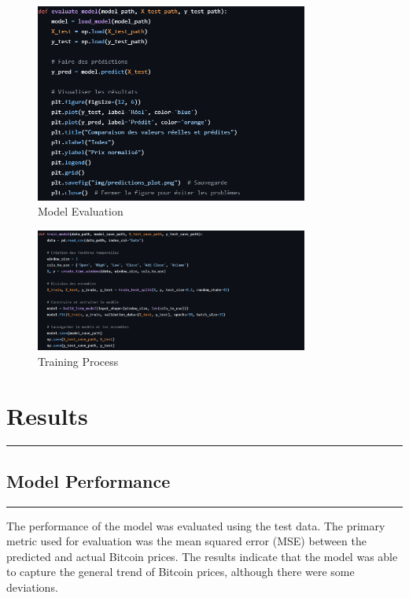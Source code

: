 \documentclass{article}
\begin{document}
\begin{figure}[h]
    \centering
    \includegraphics[width=0.8\textwidth]{img/evaluation.png}
    \caption{Model Evaluation} %
    \label{fig:evaluation}
\end{figure}

\begin{figure}[h]
    \centering
    \includegraphics[width=0.8\textwidth]{img/Capture d’écran 2025-01-05 201711.png}
    \caption{Training Process} %
    \label{fig:training}
\end{figure}

\section{Results}
\noindent\rule{\textwidth}{1pt} %
\subsection{Model Performance}
\noindent\rule{\textwidth}{1pt} %
The performance of the model was evaluated using the test data. The primary metric used for evaluation was the mean squared error (MSE) between the predicted and actual Bitcoin prices. The results indicate that the model was able to capture the general trend of Bitcoin prices, although there were some deviations.
\end{document}
